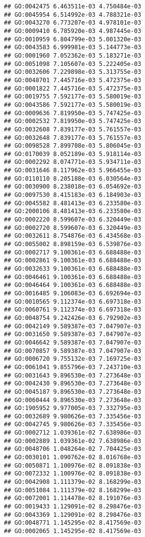 \documentclass[
]{article}
\begin{document}
\begin{verbatim}
## GO:0042475 6.463511e-03 4.750484e-03
## GO:0045954 6.514992e-03 4.788321e-03
## GO:0043270 6.773207e-03 4.978101e-03
## GO:0009410 6.785920e-03 4.987445e-03
## GO:0010959 6.804799e-03 5.001320e-03
## GO:0043583 6.999981e-03 5.144773e-03
## GO:0001960 7.052362e-03 5.183271e-03
## GO:0051098 7.105607e-03 5.222405e-03
## GO:0032606 7.229898e-03 5.313755e-03
## GO:0048701 7.445716e-03 5.472375e-03
## GO:0001822 7.445716e-03 5.472375e-03
## GO:0019755 7.592177e-03 5.580019e-03
## GO:0043586 7.592177e-03 5.580019e-03
## GO:0009636 7.819950e-03 5.747425e-03
## GO:0002532 7.819950e-03 5.747425e-03
## GO:0032608 7.839177e-03 5.761557e-03
## GO:0032648 7.839177e-03 5.761557e-03
## GO:0098528 7.899708e-03 5.806045e-03
## GO:0170039 8.052189e-03 5.918114e-03
## GO:0002292 8.074771e-03 5.934711e-03
## GO:0031646 8.117962e-03 5.966455e-03
## GO:0110110 8.205188e-03 6.030564e-03
## GO:0030900 8.238018e-03 6.054692e-03
## GO:0097530 8.415183e-03 6.184903e-03
## GO:0045582 8.481413e-03 6.233580e-03
## GO:2000106 8.481413e-03 6.233580e-03
## GO:0002220 8.599607e-03 6.320449e-03
## GO:0002720 8.599607e-03 6.320449e-03
## GO:0032611 8.754876e-03 6.434568e-03
## GO:0055002 8.898159e-03 6.539876e-03
## GO:0002717 9.100361e-03 6.688488e-03
## GO:0002861 9.100361e-03 6.688488e-03
## GO:0032633 9.100361e-03 6.688488e-03
## GO:0046461 9.100361e-03 6.688488e-03
## GO:0046464 9.100361e-03 6.688488e-03
## GO:0016485 9.106083e-03 6.692694e-03
## GO:0010565 9.112374e-03 6.697318e-03
## GO:0060761 9.112374e-03 6.697318e-03
## GO:0048754 9.242426e-03 6.792902e-03
## GO:0042149 9.589387e-03 7.047907e-03
## GO:0031650 9.589387e-03 7.047907e-03
## GO:0046642 9.589387e-03 7.047907e-03
## GO:0070857 9.589387e-03 7.047907e-03
## GO:0006720 9.755132e-03 7.169725e-03
## GO:0061041 9.855796e-03 7.243710e-03
## GO:0031643 9.896530e-03 7.273648e-03
## GO:0042430 9.896530e-03 7.273648e-03
## GO:0045187 9.896530e-03 7.273648e-03
## GO:0060444 9.896530e-03 7.273648e-03
## GO:1905952 9.977005e-03 7.332795e-03
## GO:0032689 9.980626e-03 7.335456e-03
## GO:0042745 9.980626e-03 7.335456e-03
## GO:0002712 1.039361e-02 7.638986e-03
## GO:0002889 1.039361e-02 7.638986e-03
## GO:0048706 1.048264e-02 7.704425e-03
## GO:0030101 1.090762e-02 8.016768e-03
## GO:0050871 1.100976e-02 8.091838e-03
## GO:0072332 1.100976e-02 8.091838e-03
## GO:0042908 1.111379e-02 8.168299e-03
## GO:0051084 1.111379e-02 8.168299e-03
## GO:0072001 1.114478e-02 8.191076e-03
## GO:0019433 1.129091e-02 8.298476e-03
## GO:0043369 1.129091e-02 8.298476e-03
## GO:0048771 1.145295e-02 8.417569e-03
## GO:0002065 1.145295e-02 8.417569e-03

\end{verbatim}
\end{document}
